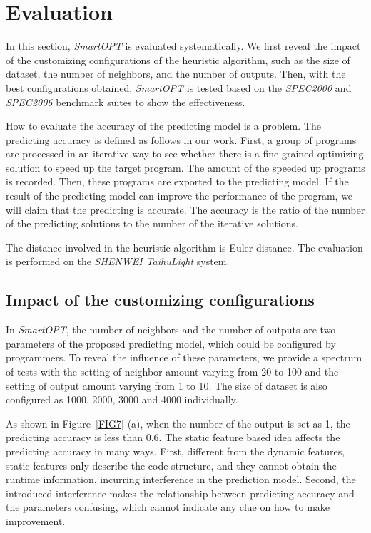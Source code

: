 \documentclass[bst/sn-mathphys]{sn-jnl}%
\theoremstyle{thmstyleone}%
\theoremstyle{thmstyletwo}%
\theoremstyle{thmstylethree}%
\begin{document}
\section{Evaluation}\label{sec6}

In this section, \emph{SmartOPT} is evaluated systematically. We first reveal 
the impact of the customizing configurations of the heuristic algorithm, such 
as the size of dataset, the number of neighbors, and the number of outputs. 
Then, with the best configurations obtained, \emph{SmartOPT} is tested based 
on the \emph{SPEC2000} and \emph{SPEC2006} benchmark suites to show the 
effectiveness.

How to evaluate the accuracy of the predicting model is a problem. The 
predicting accuracy is defined as follows in our work. First, a group of 
programs are processed in an iterative way to see whether there is a 
fine-grained optimizing solution to speed up the target program. The amount of 
the speeded up programs is recorded. Then, these programs are exported to the 
predicting model. If the result of the predicting model can improve the 
performance of the program, we will claim that the predicting is accurate. The 
accuracy is the ratio of the number of the predicting solutions to the number 
of the iterative solutions.

The distance involved in the heuristic algorithm is Euler distance. The evaluation is performed on the \emph{SHENWEI TaihuLight} system.

\subsection{Impact of the customizing configurations}

In \emph{SmartOPT}, the number of neighbors and the number of outputs are two 
parameters of the proposed predicting model, which could be configured by 
programmers. To reveal the influence of these parameters, we provide a 
spectrum of tests with the setting of neighbor amount varying from 20 to 100 
and the setting of output amount varying from 1 to 10. The size of dataset is 
also configured as 1000, 2000, 3000 and 4000 individually.

As shown in Figure~\ref{FIG7} (a), when the number of the output is set as 1, the 
predicting accuracy is less than 0.6. The static feature based idea affects the 
predicting accuracy in many ways. First, different from the dynamic features, 
static features only describe the code structure, and they cannot obtain the 
runtime information, incurring interference in the prediction model. Second, 
the introduced interference makes the relationship between predicting accuracy 
and the parameters confusing, which cannot indicate any clue on how to make 
improvement.
\end{document}
